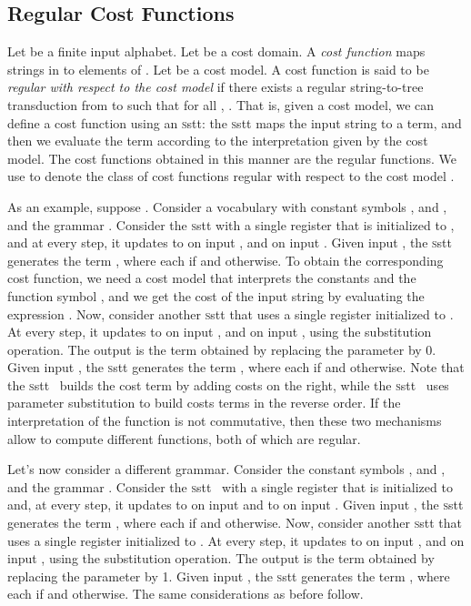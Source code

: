 \documentclass[11pt]{article}
\newcommand{\mypar}[1]{\subsection{#1}}
\newcommand{\SSTT}{{\sc\textsc sstt}\xspace}
\begin{document}
\mypar{Regular Cost Functions}\label{subsec:reg}
Let  be a finite input alphabet.  Let  be a cost
domain. A {\em cost function}  maps strings in  to
elements of . Let 
be a cost model.  A cost function  is said to be {\em regular with
respect to the cost model \/} if there exists a regular
string-to-tree transduction  from  to  such that
for all , .  That is, given a
cost model, we can define a cost function using an \SSTT: the \SSTT
maps the input string to a term, and then we evaluate the term
according to the interpretation given by the cost model.  The cost
functions obtained in this manner are the regular functions.  We use
 to denote the class of cost functions regular with
respect to the cost model .

As an example, suppose .  Consider a vocabulary with
constant symbols ,  and , and the grammar .
Consider the \SSTT  with a single register that is initialized
to , and at every step, it updates  to  on input ,
and  on input .  Given input , the \SSTT
generates the term , where each
 if  and  otherwise.  To obtain the
corresponding cost function, we need a cost model that interprets the
constants and the function symbol , and we get the cost of the
input string by evaluating the expression .  Now, consider another
\SSTT  that uses a single register initialized to .  At
every step, it updates  to  on input , and
 on input , using the substitution operation.  The
output is the term  obtained by replacing the parameter by 0.
Given input , the \SSTT generates the term , where each  if  and 
otherwise.  Note that the \SSTT~ builds the cost term by adding
costs on the right, while the \SSTT~ uses parameter
substitution to build costs terms in the reverse order.  If the
interpretation of the function  is not commutative, then these two
mechanisms allow to compute different functions, both of which are
regular.

Let's now consider a different grammar. Consider the constant symbols
,  and , and the grammar .
Consider the \SSTT~ with a single register that is initialized
to  and, at every step, it updates  to  on input 
and to  on input .
Given input , the \SSTT
generates the term
, where each
 if  and  otherwise.
Now, consider another
\SSTT  that uses a single register initialized to .
At every step, it updates  to  on input , and
 on input , using the substitution operation.  The
output is the term  obtained by replacing the parameter by 1.
Given input , the \SSTT
generates the term
, where each
 if  and  otherwise. The same considerations as before follow.
\end{document}
